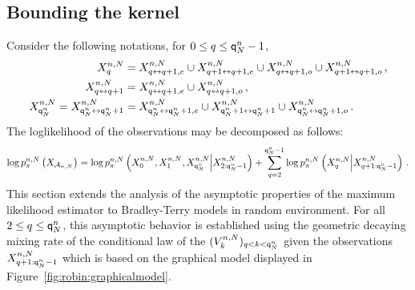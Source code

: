 \subsection{Bounding the kernel}
Consider the following notations, for $0\le q \le {\mathsf{q}}^{n}_{N}-1$,
\begin{align*}
X_{q}^{n,N}                   & = X_{q \leftrightarrow q+1,e}^{n,N}\cup X_{q+1\leftrightarrow q+1,e}^{n,N}\cup X_{q\leftrightarrow q+1,o}^{n,N}\cup X_{q+1 \leftrightarrow q+1,o}^{n,N}\,,\\
X^{n,N}_{q\leftrightarrow q+1} &= X^{n,N}_{q\leftrightarrow q+1,e}\cup X^{n,N}_{q\leftrightarrow q+1,o}\,,\\
X_{{\mathsf{q}}^{n}_{N}}^{n,N} = X_{{\mathsf{q}}^{n}_{N}\leftrightarrow{\mathsf{q}}^{n}_{N}+1}^{n,N} & = X_{{\mathsf{q}}^{n}_{N} \leftrightarrow {\mathsf{q}}^{n}_{N} +1,e}^{n,N}\cup X_{{\mathsf{q}}^{n}_{N}+1\leftrightarrow{\mathsf{q}}^{n}_{N}+1}^{n,N}\cup X_{{\mathsf{q}}^{n}_{N}\leftrightarrow{\mathsf{q}}^{n}_{N}+1,o}^{n,N}\,.
\end{align*}
The loglikelihood of the observations may be decomposed as follows:
\[
\log p_{\pi}^{n,N}\left(X_{\mathcal{A}_{n,N}}\right) = \log p_{\pi}^{n,N}\left(X_{0}^{n,N},X_{1}^{n,N},X_{{\mathsf{q}}^{n}_{N}}^{n,N}\middle|X_{2:{\mathsf{q}}^{n}_{N}-1}^{n,N}\right) + \sum_{q=2}^{{\mathsf{q}}^{n}_{N}-1}  \log p_{\pi}^{n,N}\left(X_{q}^{n,N}\middle|X_{q+1:{\mathsf{q}}^{n}_{N}-1}^{n,N}\right)\,.
\]
This section extends the analysis of the asymptotic properties of the maximum likelihood estimator to Bradley-Terry models in random environment. For all $2\le q \le {\mathsf{q}}^{n}_{N}$, this asymptotic behavior is established using the geometric decaying mixing rate of the conditional law of the $(V^{n,N}_{k})_{q< k < {\mathsf{q}}^{n}_{N}}$ given the observations $X^{n,N}_{q+1:{\mathsf{q}}^{n}_{N}-1}$ which is based on the graphical model displayed in Figure~\ref{fig:robin:graphicalmodel}.
